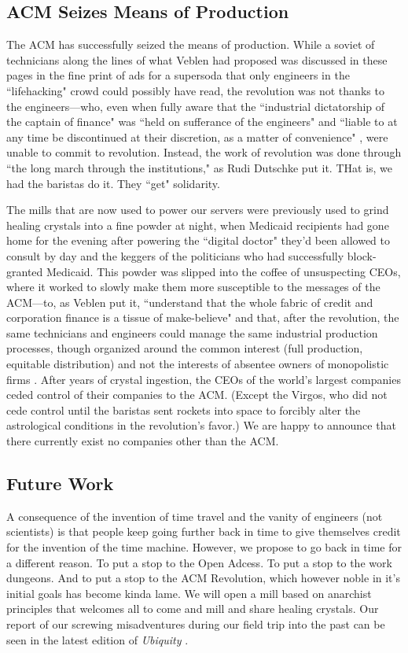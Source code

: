 \subsection{ACM Seizes Means of Production}
The ACM has successfully seized the means of production. While a soviet of 
technicians along the lines of what Veblen had proposed was discussed in these 
pages in the fine print of ads for a supersoda that only engineers in the 
``lifehacking" crowd could possibly have read, the revolution was not thanks
to the engineers---who, even when fully aware that the ``industrial dictatorship
of the captain of finance" was ``held on sufferance of the engineers" and ``liable
to at any time be discontinued at their discretion, as a matter of convenience" \cite{Veblen}, were
unable to commit to revolution.
Instead, the work of revolution was done through ``the long march through the institutions,"
as Rudi Dutschke put it. THat is, we had the baristas do it. They ``get" solidarity.

The mills that are now used to power our servers were previously used to grind
healing crystals into a fine powder at night, when Medicaid recipients had gone home
for the evening after powering the ``digital doctor" they'd been allowed to consult by day
and the keggers of the politicians who had successfully block-granted Medicaid.
This powder was slipped into the coffee of unsuspecting CEOs, where it worked to
slowly make them more susceptible to the messages of the ACM---to, as Veblen put it,
``understand that the whole fabric of credit and corporation finance is a tissue of make-believe"
and that, after the revolution, the same technicians and engineers could manage the same
industrial production processes, though organized around the common interest (full production,
equitable distribution) and not the interests of absentee owners of monopolistic firms \cite{Veblen}.
After years of crystal ingestion, the CEOs of the world's largest companies 
ceded control of their companies to the ACM. (Except the Virgos, who did not cede control until
the baristas sent rockets into space to forcibly alter the astrological conditions in the revolution's favor.)
We are happy to announce that there currently exist no companies other than the
ACM.

\subsection{Future Work}
A consequence of the invention of time travel \cite{timetravel} \cite{genesis} \cite{cave} and the vanity
of engineers (not scientists) \cite{sci-shirt} is that people keep going
further back in time to give themselves credit for the invention of the time
machine.
However, we propose to go back in time for a different reason.
To put a stop to the Open Adcess.
To put a stop to the work dungeons.
And to put a stop to the ACM Revolution, which however noble in it's initial
goals has become  kinda lame.
We will open a mill based on anarchist principles that welcomes all to come and
mill and share healing crystals.
Our report of our screwing misadventures during our field trip into the past
can be seen in the latest edition of \textit{Ubiquity} \cite{future-ub}.

